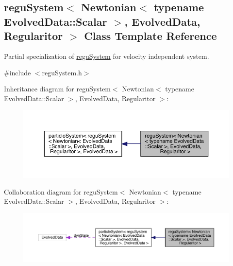 \hypertarget{classregu_system_3_01_newtonian_3_01typename_01_evolved_data_1_1_scalar_01_4_00_01_evolved_data_00_01_regularitor_01_4}{}\subsection{regu\+System$<$ Newtonian$<$ typename Evolved\+Data\+:\+:Scalar $>$, Evolved\+Data, Regularitor $>$ Class Template Reference}
\label{classregu_system_3_01_newtonian_3_01typename_01_evolved_data_1_1_scalar_01_4_00_01_evolved_data_00_01_regularitor_01_4}


Partial specialization of \mbox{\hyperlink{classregu_system}{regu\+System}} for velocity independent system.  




{\ttfamily \#include $<$regu\+System.\+h$>$}



Inheritance diagram for regu\+System$<$ Newtonian$<$ typename Evolved\+Data\+:\+:Scalar $>$, Evolved\+Data, Regularitor $>$\+:\nopagebreak
\begin{figure}[H]
\begin{center}
\leavevmode
\includegraphics[width=350pt]{classregu_system_3_01_newtonian_3_01typename_01_evolved_data_1_1_scalar_01_4_00_01_evolved_data_c2749d44fe7bf9b2389e9de4efb95e1b}
\end{center}
\end{figure}


Collaboration diagram for regu\+System$<$ Newtonian$<$ typename Evolved\+Data\+:\+:Scalar $>$, Evolved\+Data, Regularitor $>$\+:\nopagebreak
\begin{figure}[H]
\begin{center}
\leavevmode
\includegraphics[width=350pt]{classregu_system_3_01_newtonian_3_01typename_01_evolved_data_1_1_scalar_01_4_00_01_evolved_data_ab8a227f22946e01b399bfcd69c7be8d}
\end{center}
\end{figure}
